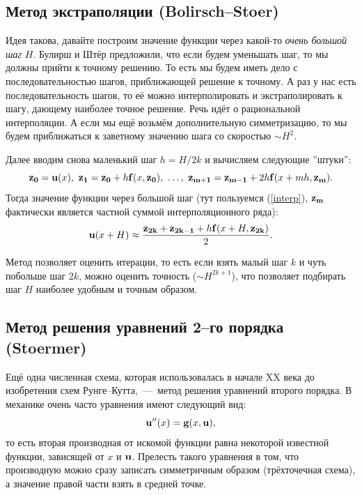 \documentclass[a4paper,9pt,russian]{article}
\begin{document}
\subsection{Метод экстраполяции (Bolirsch--Stoer)}
    Идея такова, давайте построим значение функции через какой-то {\it очень большой шаг} $H$. Булирш и Штёр предложили, что если будем уменьшать шаг, то мы должны прийти к точному решению. То есть мы будем иметь дело с последовательностью шагов, приближающей решение к точному. А раз у нас есть последовательность шагов, то её можно интерполировать и экстраполировать к шагу, дающему наиболее точное решение. Речь идёт о рациональной интерполяции. А если мы ещё возьмём дополнительную симметризацию, то мы будем приближаться к заветному значению шага со скоростью $\sim H^2$.\par
    Далее вводим снова маленький шаг $h = {H}/{2k}$  и вычисляем следующие ''штуки'':
    \begin{equation}
     {\bf z_0} = {\bf u}(x),\ {\bf z_1} = {\bf z_0}+h{\bf f}(x,{\bf z_0}),\ \dots ,\ {\bf z_{m+1}} = {\bf z_{m-1}}+2h{\bf f}(x + mh,{\bf z_m}).
    \end{equation}
    Тогда значение функции через большой шаг (тут пользуемся (\ref{interp}), ${\bf z_m}$ фактически является частной суммой интерполяционного ряда):
    \begin{equation}
     {\bf u}(x + H) \approx \frac{{\bf z_{2k}} + {\bf z_{2k-1}}+ h{\bf f}(x+H, {\bf z_{2k}})}{2} .
    \end{equation}\par
    {Метод позволяет оценить итерации,} то есть если взять малый шаг $k$ и чуть побольше шаг $2k$, {можно оценить точность ($\sim H^{2k+1}$), что} {позволяет подбирать шаг $H$ наиболее удобным и точным образом.}
\subsection{Метод решения уравнений 2--го порядка (Stoermer)}
    Ещё одна численная схема, которая использовалась в начале XX века до изобретения схем Рунге--Кутта,~---~метод решения уравнений второго порядка. В механике очень часто уравнения имеют следующий вид:
    \begin{equation}
     {\bf u''}(x) = {\bf g}(x, {\bf u}),
    \end{equation}
    то есть вторая производная от искомой функции равна некоторой известной функции, зависящей от $x$ и ${\bf u}$. Прелесть такого уравнения в том, что производную можно сразу записать симметричным образом (трёхточечная схема), а значение правой части взять в средней точке.
    
\end{document}
